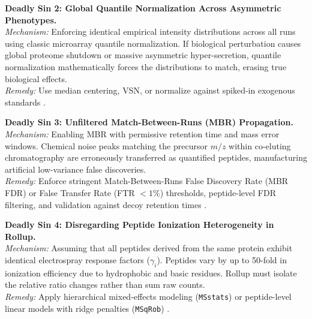 \documentclass[11pt,oneside]{book}
\begin{document}
\begin{pitfallbox}[top=4pt, bottom=4pt, before skip=3pt, after skip=3pt]
\textbf{Deadly Sin 2: Global Quantile Normalization Across Asymmetric Phenotypes.}\\
\textit{Mechanism:} Enforcing identical empirical intensity distributions across all runs using classic microarray quantile normalization. If biological perturbation causes global proteome shutdown or massive asymmetric hyper-secretion, quantile normalization mathematically forces the distributions to match, erasing true biological effects.\\
\textit{Remedy:} Use median centering, VSN, or normalize against spiked-in exogenous standards \cite{callister2006normalization, bolstad2003comparison}.
\end{pitfallbox}

\begin{pitfallbox}[top=4pt, bottom=4pt, before skip=3pt, after skip=3pt]
\textbf{Deadly Sin 3: Unfiltered Match-Between-Runs (MBR) Propagation.}\\
\textit{Mechanism:} Enabling MBR with permissive retention time and mass error windows. Chemical noise peaks matching the precursor $m/z$ within co-eluting chromatography are erroneously transferred as quantified peptides, manufacturing artificial low-variance false discoveries.\\
\textit{Remedy:} Enforce stringent Match-Between-Runs False Discovery Rate (MBR FDR) or False Transfer Rate (FTR $< 1\%$) thresholds, peptide-level FDR filtering, and validation against decoy retention times \cite{cox2014maxlfq, demichev2020dia}.
\end{pitfallbox}

\begin{pitfallbox}[top=4pt, bottom=4pt, before skip=3pt, after skip=3pt]
\textbf{Deadly Sin 4: Disregarding Peptide Ionization Heterogeneity in Rollup.}\\
\textit{Mechanism:} Assuming that all peptides derived from the same protein exhibit identical electrospray response factors ($\gamma_i$). Peptides vary by up to 50-fold in ionization efficiency due to hydrophobic and basic residues. Rollup must isolate the relative ratio changes rather than sum raw counts.\\
\textit{Remedy:} Apply hierarchical mixed-effects modeling (\texttt{MSstats}) or peptide-level linear models with ridge penalties (\texttt{MSqRob}) \cite{choi2014msstats, goeminne2016msqrob2}.
\end{pitfallbox}
\end{document}
